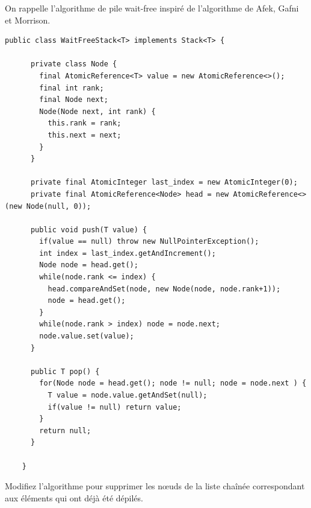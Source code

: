 
\begingroup

\begin{exercice}
  On rappelle l'algorithme de pile wait-free inspiré de l'algorithme de Afek, Gafni et Morrison. 
  
  \begin{lstlisting}[numbers=none]
    public class WaitFreeStack<T> implements Stack<T> {

      private class Node {
        final AtomicReference<T> value = new AtomicReference<>();
        final int rank;
        final Node next;
        Node(Node next, int rank) {
          this.rank = rank;
          this.next = next;
        }
      }

      private final AtomicInteger last_index = new AtomicInteger(0);
      private final AtomicReference<Node> head = new AtomicReference<>(new Node(null, 0));

      public void push(T value) {
        if(value == null) throw new NullPointerException();
        int index = last_index.getAndIncrement();
        Node node = head.get();
        while(node.rank <= index) {
          head.compareAndSet(node, new Node(node, node.rank+1));
          node = head.get();
        }
        while(node.rank > index) node = node.next;
        node.value.set(value);
      }

      public T pop() {
        for(Node node = head.get(); node != null; node = node.next ) {
          T value = node.value.getAndSet(null);
          if(value != null) return value;
        }
        return null;
      }
      
    }
  \end{lstlisting}
  \begin{questions}
  \item Modifiez l'algorithme pour supprimer les n\oe uds de la liste chaînée correspondant aux éléments qui ont déjà été dépilés. 
  \end{questions}
\end{exercice}

\endgroup
\endinput
